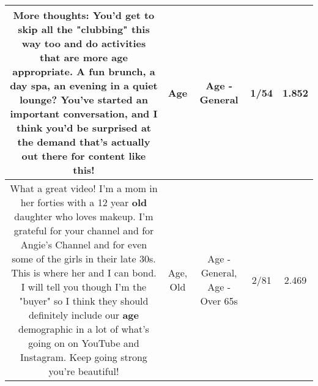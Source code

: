 \documentclass[11pt]{article}
\newlength\mylength
\begin{document}
\begin{center}
\begin{longtable}{|C{.65\mylength}|C{.30\mylength}|C{.12\mylength}|C{.12\mylength}|C{.12\mylength}|}
  \small More thoughts: You'd get to skip all the "clubbing" this way too and do activities that are more \textbf{age} appropriate. A fun brunch, a day spa, an evening in a quiet lounge? You've started an important conversation, and I think you'd be surprised at the demand that's actually out there for content like this!\normalsize   & Age & Age - General & 1/54 & 1.852 \\  \hline
  \small What a great video! I'm a mom in her forties with a 12 year \textbf{old} daughter who loves makeup. I'm grateful for your channel and for Angie's Channel and for even some of the girls in their late 30s. This is where her and I can bond. I will tell you though I'm the "buyer" so I think they should definitely include our \textbf{age} demographic in a lot of what's going on on YouTube and Instagram. Keep going strong you're beautiful!\normalsize   & Age, Old & Age - General, Age - Over 65s & 2/81 & 2.469 \\  \hline

\end{longtable}
\end{center}
\end{document}
